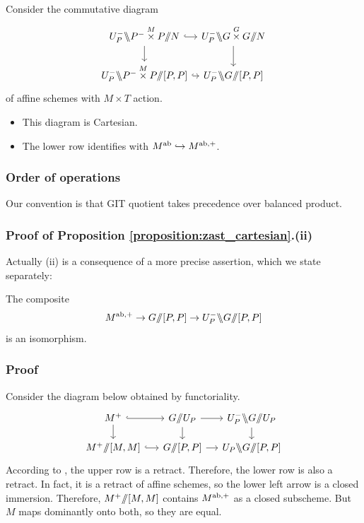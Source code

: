 \begin{proposition}
\label{proposition:zast_cartesian}
Consider the commutative diagram
\begin{equation}
  \begin{tikzcd}[
  column sep={9em,between origins},
  row sep={4em,between origins}
]
\label{eqn:zast_cartesian}
    U_P^- \bss P^- \overset{M}{\times} P \git N \arrow[r, hook] \arrow[d] & U_P^- \bss G \overset{G}{\times} G \git N \arrow[d] \\
    U_P^- \bss P^- \overset{M}{\times} P \git [P,P] \arrow[r, hook] & U_P^- \bss G \git [P,P]
  \end{tikzcd}
\end{equation}
of affine schemes with $M \times T$ action.
\begin{itemize}
    \item[(i)] This diagram is Cartesian.
    \item[(ii)] The lower row identifies with $M^{\mathrm{ab}} \hookrightarrow M^{\mathrm{ab},+}$.
\end{itemize}
\end{proposition}

\subsubsection{Order of operations} Our convention is that GIT quotient takes precedence over balanced product.

\subsubsection{Proof of Proposition \ref{proposition:zast_cartesian}.(ii)} Actually (ii) is a consequence of a more precise assertion, which we state separately: 

\begin{proposition}
\label{proposition:retract}
The composite
  \[M^{\mathrm{ab},+} \to G / \!\! / [P,P] \to U_P^- \backslash\!\!\backslash G / \!\! / [P,P]\]
is an isomorphism.
\end{proposition}

\subsubsection{Proof} Consider the diagram below obtained by functoriality.
\[
\begin{tikzcd}[
  column sep={7em,between origins},
  row sep={3em,between origins}
]
  M^+ \arrow[r, hook] \arrow[d] & G \git U_P \arrow[r] \arrow[d] & U_P^- \bss G \git U_P \arrow[d] \\
  M^+ \git [M,M] \arrow[r, hook] & G \git [P,P] \arrow[r] & U_P \bss G \git [P,P]
\end{tikzcd}
\]
According to \cite[Theorem 3.2.8]{wang_monoid}, the upper row is a retract. Therefore, the lower row is also a retract. In fact, it is a retract of affine schemes, so the lower left arrow is a closed immersion. Therefore, $M^+ / \!\! / [M,M]$ contains $M^{\mathrm{ab},+}$ as a closed subscheme. But $M$ maps dominantly onto both, so they are equal.

